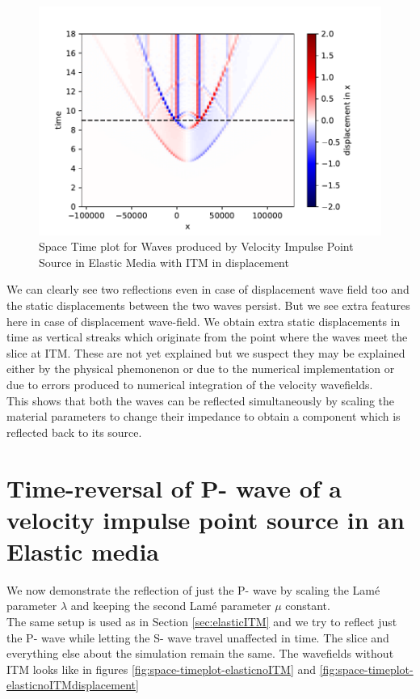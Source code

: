 \begin{figure}
    \centering
    \includegraphics[width=0.75\linewidth]{figures/Elastic-tworeflections-displacement.pdf}
    \caption{Space Time plot for Waves produced by Velocity Impulse Point Source in Elastic Media with \ac{ITM} in displacement}
    \label{fig:space-timeplot-elasticITMdisplacement}
\end{figure}

We can clearly see two reflections even in case of displacement wave field too and the static displacements between the two waves persist. But we see extra features
here in case of displacement wave-field. We obtain extra static displacements in time as vertical streaks which originate from the point where the waves meet the slice
at \ac{ITM}. These are not yet explained but we suspect they may be explained either by the physical phemonenon or due to the numerical implementation or due to errors
produced to numerical integration of the velocity wavefields. \\

This shows that both the waves can be reflected simultaneously by scaling the material parameters to change their impedance to obtain a component which 
is reflected back to its source. \\

\section{Time-reversal of P- wave of a velocity impulse point source in an Elastic media} \label{sec:elasticITMpwave}
We now demonstrate the reflection of just the P- wave by scaling the Lam\'{e} parameter $\lambda$ and keeping the second Lam\'{e} parameter $\mu$ constant.\\
The same setup is used as in Section \ref{sec:elasticITM} and we try to reflect just the P- wave while letting the S- wave travel unaffected in time. The slice
and everything else about the simulation remain the same. The wavefields without \ac{ITM} looks like in figures \ref{fig:space-timeplot-elasticnoITM} and
\ref{fig:space-timeplot-elasticnoITMdisplacement}

